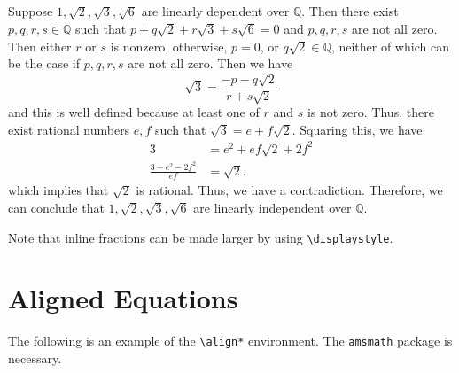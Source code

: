 \subparagraph*{}
Suppose $1,\sqrt{2},\sqrt{3},\sqrt{6}$
are linearly dependent over $\mathbb{Q}$. Then there exist
$p,q,r,s\in\mathbb{Q}$ such that $p+q\sqrt{2}+r\sqrt{3}+s\sqrt{6}=0$
and $p,q,r,s$ are not all zero. Then either $r$ or $s$ is nonzero,
otherwise, $p=0$, or $q\sqrt{2}\in\mathbb{Q}$, neither of which can be
the case if $p,q,r,s$ are not all zero. Then we have
\begin{displaymath}
  \sqrt{3}=\frac{-p-q\sqrt{2}}{r+s\sqrt{2}}
\end{displaymath}
and this is well defined because at least one of $r$ and $s$ is not
zero. Thus, there exist rational numbers $e,f$ such that
$\sqrt{3}=e+f\sqrt{2}$.  Squaring this, we have
\begin{align*}
  3 &= e^2+ef\sqrt{2}+2f^2 \\
  \frac{3-e^2-2f^2}{ef} &= \sqrt{2}.
\end{align*}
which implies that $\sqrt{2}$ is rational.  Thus, we have a
contradiction. Therefore, we can conclude that
$1,\sqrt{2},\sqrt{3},\sqrt{6}$ are linearly independent over
$\mathbb{Q}$.

Note that inline fractions can be made larger by using
\verb|\displaystyle|.

\section{Aligned Equations}
\label{sec:aligned-equations}

The following is an example of the \verb|\align*| environment.  The
\texttt{amsmath} package is necessary.

